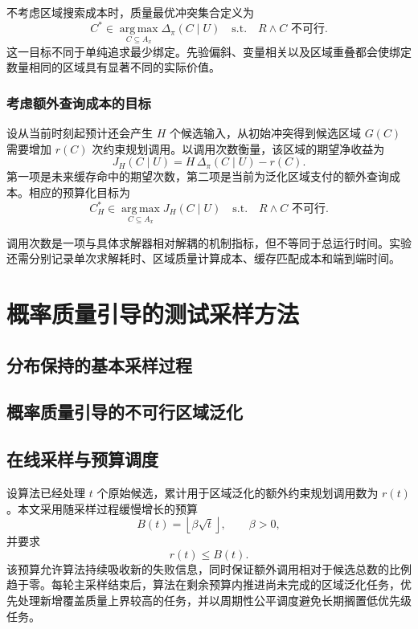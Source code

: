 \documentclass[UTF8, fontset=none, a4paper, 12pt]{ctexart}
\begin{document}
不考虑区域搜索成本时，质量最优冲突集合定义为
\[
  C^*\in
  \operatorname*{arg\,max}_{C\subseteq A_x}
  \Delta_{\pi}(C\mid U)
  \quad\text{s.t.}\quad
  R\land C\text{ 不可行}.
\]
这一目标不同于单纯追求最少绑定。先验偏斜、变量相关以及区域重叠都会使绑定数量相同的区域具有显著不同的实际价值。

\subsubsection{考虑额外查询成本的目标}

设从当前时刻起预计还会产生 $H$ 个候选输入，从初始冲突得到候选区域 $G(C)$ 需要增加 $r(C)$ 次约束规划调用。以调用次数衡量，该区域的期望净收益为
\[
  J_H(C\mid U)
  =H\,\Delta_{\pi}(C\mid U)-r(C).
\]
第一项是未来缓存命中的期望次数，第二项是当前为泛化区域支付的额外查询成本。相应的预算化目标为
\[
  C_H^*\in
  \operatorname*{arg\,max}_{C\subseteq A_x}
  J_H(C\mid U)
  \quad\text{s.t.}\quad
  R\land C\text{ 不可行}.
\]

调用次数是一项与具体求解器相对解耦的机制指标，但不等同于总运行时间。实验还需分别记录单次求解耗时、区域质量计算成本、缓存匹配成本和端到端时间。

\section{概率质量引导的测试采样方法}

\subsection{分布保持的基本采样过程}


\subsection{概率质量引导的不可行区域泛化}


\subsection{在线采样与预算调度}

设算法已经处理 $t$ 个原始候选，累计用于区域泛化的额外约束规划调用数为 $r(t)$。本文采用随采样过程缓慢增长的预算
\[
  B(t)=\left\lfloor\beta\sqrt{t}\right\rfloor,
  \qquad \beta>0,
\]
并要求
\[
  r(t)\le B(t).
\]
该预算允许算法持续吸收新的失败信息，同时保证额外调用相对于候选总数的比例趋于零。每轮主采样结束后，算法在剩余预算内推进尚未完成的区域泛化任务，优先处理新增覆盖质量上界较高的任务，并以周期性公平调度避免长期搁置低优先级任务。
\end{document}
